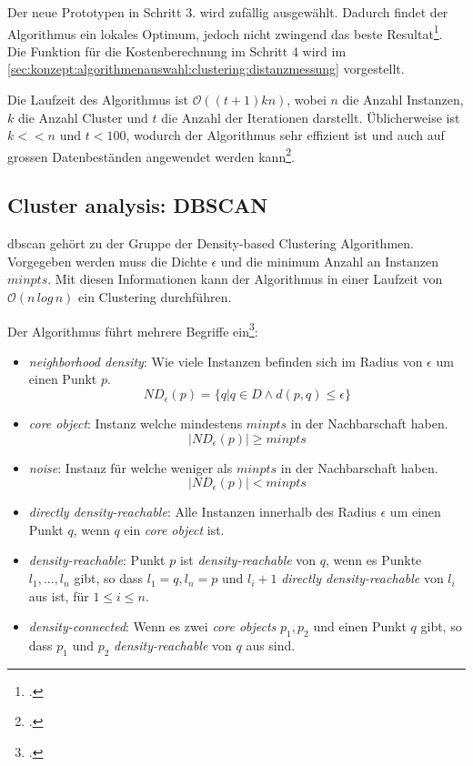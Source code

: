 Der neue Prototypen in Schritt 3. wird zufällig ausgewählt. Dadurch findet der Algorithmus ein lokales Optimum, jedoch nicht zwingend das beste Resultat\footcite{data_mining_concepts_and_techniques}.
Die Funktion für die Kostenberechnung im Schritt 4 wird im \cref{sec:konzept:algorithmenauswahl:clustering:distanzmessung} vorgestellt.

Die Laufzeit des Algorithmus ist $\mathcal{O}((t+1)kn)$, wobei $n$ die Anzahl Instanzen, $k$ die Anzahl Cluster und $t$ die Anzahl der Iterationen darstellt. Üblicherweise ist $k << n$ und $t < 100$, wodurch der Algorithmus sehr effizient ist und auch auf grossen Datenbeständen angewendet werden kann\footcite{clustering_numeric_and_categorical_values}.

\subsection{Cluster analysis: DBSCAN}
\label{sec:recherche:algorithmen:dbscan}
\gls{dbscan} gehört zu der Gruppe der Density-based Clustering Algorithmen. 
Vorgegeben werden muss die Dichte $\epsilon$ und die minimum Anzahl an Instanzen $minpts$. Mit diesen Informationen kann der Algorithmus in einer Laufzeit von $\mathcal{O}(n\,log\,n)$ ein Clustering durchführen.

Der Algorithmus führt mehrere Begriffe ein\footcite{data_mining_concepts_and_techniques}:
\begin{itemize}
	\item \textit{neighborhood density}: Wie viele Instanzen befinden sich im Radius von $\epsilon$ um einen Punkt $p$. 
	\begin{equation}
	\mathit{ND}_{\epsilon}(p) = \{q | q \in D \wedge d(p,q) \leq \epsilon\}
	\end{equation}
	\item \textit{core object}: Instanz welche mindestens $minpts$ in der Nachbarschaft haben.
	\begin{equation}
	|\mathit{ND}_{\epsilon}(p)| \geq minpts
	\end{equation}
	\item \textit{noise}: Instanz für welche weniger als $minpts$ in der Nachbarschaft haben.
	\begin{equation}
	|\mathit{ND}_{\epsilon}(p)| < minpts
	\end{equation}
	\item \textit{directly density-reachable}: Alle Instanzen innerhalb des Radius $\epsilon$ um einen Punkt $q$, wenn $q$ ein \textit{core object} ist.
	\item \textit{density-reachable}: Punkt $p$ ist \textit{density-reachable} von $q$, wenn es Punkte $l_1,...,l_n$ gibt, so dass $l_1=q, l_n=p$ und $l_i+1$ \textit{directly density-reachable} von $l_i$ aus ist, für $1 \leq i \leq n$.
	\item \textit{density-connected}: Wenn es zwei \textit{core objects} $p_1,p_2$ und einen Punkt $q$ gibt, so dass $p_1$ und $p_2$ \textit{density-reachable} von $q$ aus sind.
\end{itemize}

